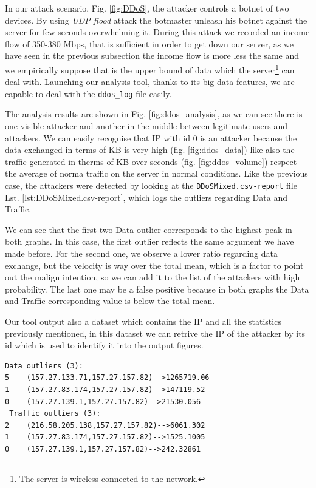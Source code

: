 In our attack scenario, Fig. \ref{fig:DDoS},  the attacker controls a botnet of two devices.
By using \textit{UDP flood} attack the botmaster unleash his botnet against the server for few seconds overwhelming it. 
During this attack we recorded an income flow of 350-380 Mbps, that is sufficient in order to get down our server, as we have seen in the previous subsection the income flow is more less the same and we empirically suppose that is the upper bound of data which the server\footnote{The server is wireless connected to the network.} can deal with.
Launching our analysis tool, thanks to its big data features, we are capable to deal with the \texttt{ddos\_log} file easily.

The analysis results are shown in Fig. \ref{fig:ddos_analysis}, as we can see there is one visible attacker and another in the middle between legitimate users and attackers. 
We can easily recognise that IP with id 0 is an attacker  because the data exchanged in terms of KB is very high (fig. \ref{fig:ddos_data}) like also the traffic generated in therms of KB over seconds (fig. \ref{fig:ddos_volume}) respect the average of norma traffic on the server in normal conditions. 
Like the previous case, the attackers were detected by looking at the \texttt{DDoSMixed.csv-report} file Lst. \ref{lst:DDoSMixed.csv-report}, which logs the outliers regarding Data and Traffic.

We can see that the first two Data outlier corresponds to the highest peak in both graphs. In this case, the first outlier reflects the same argument we have made before. For the second one, we observe a lower ratio regarding data exchange, but the velocity is way over the total mean, which is a factor to point out the malign intention, so we can add it to the list of the attackers with high probability. The last one may be a false positive because in both graphs the Data and Traffic corresponding value is below the total mean.

Our tool output also a dataset which contains the IP and all the statistics previously mentioned, in this dataset we can retrive the IP of the attacker by its id which is used to identify it into the output figures. 

\begin{lstlisting}[columns=flexible, breaklines=true, frame=tb, caption={\textit{DDoSMixed.csv-report} file}, label={lst:DDoSMixed.csv-report}]
 Data outliers (3):
5    (157.27.133.71,157.27.157.82)-->1265719.06
1    (157.27.83.174,157.27.157.82)-->147119.52
0    (157.27.139.1,157.27.157.82)-->21530.056
 Traffic outliers (3):
2    (216.58.205.138,157.27.157.82)-->6061.302
1    (157.27.83.174,157.27.157.82)-->1525.1005
0    (157.27.139.1,157.27.157.82)-->242.32861
\end{lstlisting}